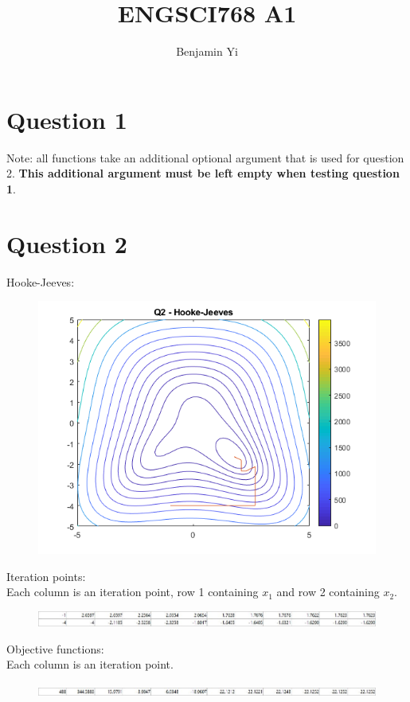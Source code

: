 \documentclass[10pt,a4paper]{article}
\begin{document}
\title{ENGSCI768 A1}
\author{Benjamin Yi}
	
\section*{Question 1}
Note: all functions take an additional optional argument that is used for question 2. \textbf{This additional argument must be left empty when testing question 1}.
 
\newpage
\section*{Question 2}
Hooke-Jeeves:
\begin{figure} [H]
	\centering
	\includegraphics[width=0.7\linewidth]{q2hj}
\end{figure}
Iteration points: \\
Each column is an iteration point, row 1 containing \(x_1\) and row 2 containing \(x_2\).
\begin{figure} [H]
	\centering
	\includegraphics[width=1\linewidth]{q2hjp}
\end{figure}
Objective functions: \\
Each column is an iteration point.
\begin{figure} [H]
	\centering
	\includegraphics[width=1\linewidth]{q2hjf}
\end{figure}
\end{document}
